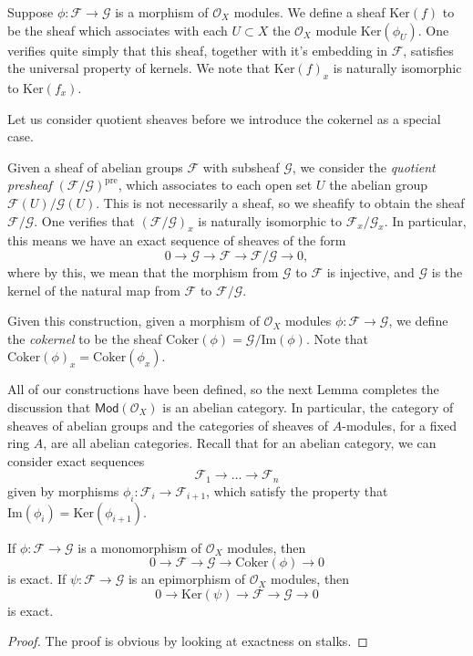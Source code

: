 \begin{example}
    Suppose $\phi: \mathcal{F} \to \mathcal{G}$ is a morphism of $\mathcal{O}_X$ modules. We define a sheaf $\text{Ker}(f)$ to be the sheaf which associates with each $U \subset X$ the $\mathcal{O}_X$ module $\text{Ker}(\phi_U)$. One verifies quite simply that this sheaf, together with it's embedding in $\mathcal{F}$, satisfies the universal property of kernels. We note that $\text{Ker}(f)_x$ is naturally isomorphic to $\text{Ker}(f_x)$.
\end{example}

Let us consider quotient sheaves before we introduce the cokernel as a special case.

\begin{example}
    Given a sheaf of abelian groups $\mathcal{F}$ with subsheaf $\mathcal{G}$, we consider the \emph{quotient presheaf} $(\mathcal{F}/\mathcal{G})^{\text{pre}}$, which associates to each open set $U$ the abelian group $\mathcal{F}(U)/\mathcal{G}(U)$. This is not necessarily a sheaf, so we sheafify to obtain the sheaf $\mathcal{F}/\mathcal{G}$. One verifies that $(\mathcal{F}/\mathcal{G})_x$ is naturally isomorphic to $\mathcal{F}_x / \mathcal{G}_x$. In particular, this means we have an exact sequence of sheaves of the form
    \[ 0 \to \mathcal{G} \to \mathcal{F} \to \mathcal{F}/\mathcal{G} \to 0, \]
    where by this, we mean that the morphism from $\mathcal{G}$ to $\mathcal{F}$ is injective, and $\mathcal{G}$ is the kernel of the natural map from $\mathcal{F}$ to $\mathcal{F}/\mathcal{G}$.
\end{example}

Given this construction, given a morphism of $\mathcal{O}_X$ modules $\phi: \mathcal{F} \to \mathcal{G}$, we define the \emph{cokernel} to be the sheaf $\text{Coker}(\phi) = \mathcal{G}/\text{Im}(\phi)$. Note that $\text{Coker}(\phi)_x = \text{Coker}(\phi_x)$.

All of our constructions have been defined, so the next Lemma completes the discussion that $\mathsf{Mod}(\mathcal{O}_X)$ is an abelian category. In particular, the category of sheaves of abelian groups and the categories of sheaves of $A$-modules, for a fixed ring $A$, are all abelian categories. Recall that for an abelian category, we can consider exact sequences
%
\[ \mathcal{F}_1 \to \dots \to \mathcal{F}_n \]
%
given by morphisms $\phi_i: \mathcal{F}_i \to \mathcal{F}_{i+1}$, which satisfy the property that $\text{Im}(\phi_i) = \text{Ker}(\phi_{i+1})$.

\begin{lemma}
    If $\phi: \mathcal{F} \to \mathcal{G}$ is a monomorphism of $\mathcal{O}_X$ modules, then
    \[ 0 \to \mathcal{F} \to \mathcal{G} \to \text{Coker}(\phi) \to 0 \]
    is exact. If $\psi: \mathcal{F} \to \mathcal{G}$ is an epimorphism of $\mathcal{O}_X$ modules, then
    \[ 0 \to \text{Ker}(\psi) \to \mathcal{F} \to \mathcal{G} \to 0 \]
    is exact.
\end{lemma}
\begin{proof}
    The proof is obvious by looking at exactness on stalks.
\end{proof}

